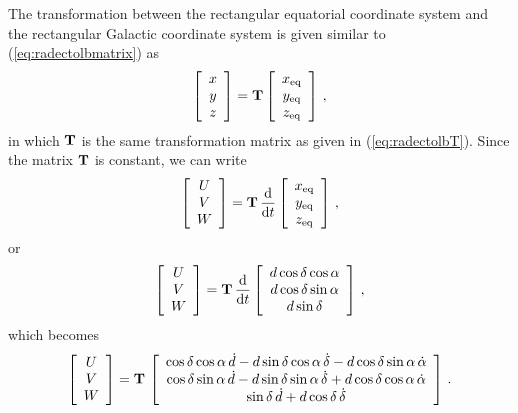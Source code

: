The transformation between the rectangular equatorial coordinate
system and the rectangular Galactic coordinate system is given similar
to (\ref{eq:radectolbmatrix}) as
\begin{equation}\label{eq:receqtorecgal}
\left[ \begin{array}{c} x \\ y \\ z \end{array} \right] =
\mathbf{T} \left[ \begin{array}{c} x_{\textnormal{eq}} \\ y_{\textnormal{eq}} \\ z_{\textnormal{eq}} \end{array} \right]\, ,
\end{equation}
in which $\mathbf{T}$ is the same transformation matrix as given in
(\ref{eq:radectolbT}). Since the matrix $\mathbf{T}$ is constant, we can
write
\begin{equation}
\left[ \begin{array}{c} U \\ V \\ W \end{array} \right] =
\mathbf{T}\,  \frac{\textnormal{d}}{\textnormal{d} t} \left[  \begin{array}{c} x_{\textnormal{eq}} \\ y_{\textnormal{eq}} \\ z_{\textnormal{eq}} \end{array} \right]\, ,
\end{equation}
or
\begin{equation}
\left[ \begin{array}{c} U \\ V \\ W \end{array} \right] =
\mathbf{T}\,  \frac{\textnormal{d}}{\textnormal{d} t} \left[  \begin{array}{c} d \cos \delta \cos \alpha \\ d \cos \delta \sin \alpha \\ d \sin \delta \end{array} \right]\, ,
\end{equation}
which becomes
\begin{equation}\label{eq:simplifyddtradec1}
\left[ \begin{array}{c} U \\ V \\ W \end{array} \right] =
\mathbf{T}\, \left[  \begin{array}{c} 
\cos \delta \cos \alpha\, \dot{d} - d \sin \delta \cos \alpha\, \dot{\delta} - d \cos \delta \sin \alpha\, \dot{\alpha}
\\ \cos \delta \sin \alpha\, \dot{d} - d \sin \delta \sin \alpha\, \dot{\delta} + d \cos \delta \cos \alpha\, \dot{\alpha} 
\\ \sin \delta\, \dot{d} + d \cos \delta\, \dot{\delta} \end{array} \right]\, .
\end{equation}
